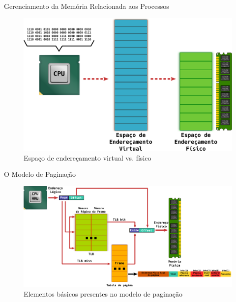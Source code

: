 \documentclass[xcolor={usenames,svgnames,dvipsnames},brazil,english,12pt,aspectratio=149]{beamer}
\begin{document}
\begin{frame}{Gerenciamento da Memória Relacionada aos Processos}
  \begin{figure}[!h]
    \centering
    \includegraphics[width=.7\textwidth]{virtual_vs_fisico} 
    \caption*{Espaço de endereçamento virtual vs. físico}
  \end{figure}
\end{frame}


\begin{frame}{O Modelo de Paginação}
  \begin{figure}[!h]
    \centering
    \includegraphics[width=\textwidth]{paginacao_presentation} 
    \caption*{Elementos básicos presentes no modelo de paginação}
  \end{figure}
\end{frame}

\end{document}
